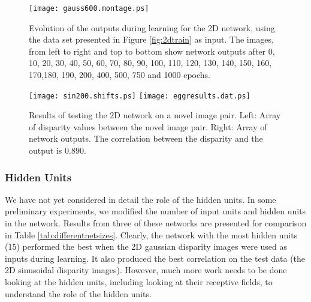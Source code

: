 \documentclass[a4paper]{article}
\begin{document}
\begin{figure}[htbp]
  \begin{center}
    \leavevmode
    \texttt{[image: gauss600.montage.ps]}
    \caption{Evolution of the outputs during learning for the 2D
      network, using the data set presented in Figure \protect
      \ref{fig:2dtrain} as input.  The images, from left to right and top to
      bottom show network outputs after 0, 10, 20, 30, 40, 50, 60, 70,
      80, 90, 100, 110, 120, 130, 140, 150, 160, 170,180, 190, 200,
      400, 500, 750 and 1000 epochs.}
    \label{fig:2d.gauss600.montage}
  \end{center}
\end{figure}





\begin{figure}[htbp]
  \begin{center}
    \leavevmode
    \texttt{[image: sin200.shifts.ps]}
    \texttt{[image: eggresults.dat.ps]}
    \caption{Results of testing the 2D network on a novel image
      pair. Left: Array of disparity values between the novel image
      pair.  Right: Array of network outputs.  The correlation between
      the disparity and the output is $0.890$.}
    \label{fig:2dtest}
  \end{center}
\end{figure}



\subsubsection{Hidden Units}

We have not yet considered in detail the role of the hidden units.  In
some preliminary experiments, we modified the number of input units
and hidden units in the network.  Results from three of these networks
are presented for comparison in Table \ref{tab:differentnetsizes}.
Clearly, the network with the most hidden units (15) performed the
best when the 2D gaussian disparity images were used as inputs during
learning.  It also produced the best correlation on the test data (the
2D sinusoidal disparity images).  However, much more work needs to be
done looking at the hidden units, including looking at their receptive
fields, to understand the role of the hidden units.


\end{document}
